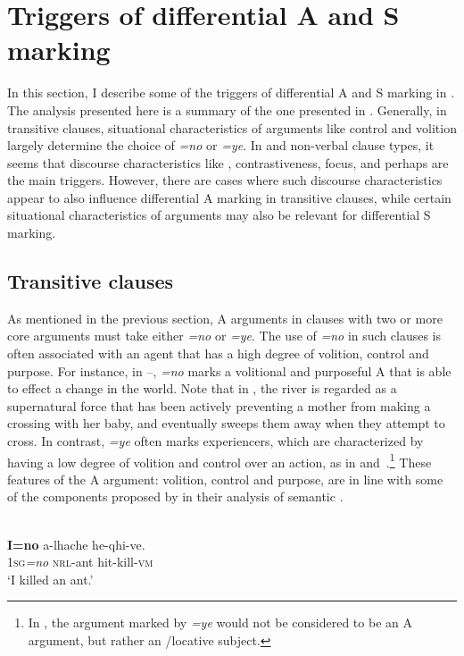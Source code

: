 \documentclass[output=paper]{LSP/langsci}
\begin{document}
\section{Triggers of differential A and S marking} \label{13-te-sec:3}

In this section, I describe some of the triggers of differential A and S marking in . The analysis presented here is a summary of the one presented in \citet{Teo.2012}. Generally, in transitive clauses, situational characteristics of arguments like control and volition largely determine the choice of \textit{=no} or \textit{=ye}. In  and non-verbal clause types, it seems that discourse characteristics like , contrastiveness, focus, and perhaps  are the main triggers. However, there are cases where such discourse characteristics appear to also influence differential A marking in transitive clauses, while certain situational characteristics of arguments may also be relevant for differential S marking.


\subsection{Transitive clauses}\label{13-te-sec:3.1}

As mentioned in the previous section, A arguments in clauses with two or more core arguments must take either \textit{=no} or \textit{=ye}. The use of \textit{=no} in such clauses is often associated with an agent that has a high degree of volition, control and purpose. For instance, in --, \textit{=no} marks a volitional and purposeful A that is able to effect a change in the world. Note that in , the river is regarded as a supernatural force that has been actively preventing a mother from making a crossing with her baby, and eventually sweeps them away when they attempt to cross. In contrast, \textit{=ye} often marks experiencers, which are characterized by having a low degree of volition and control over an action, as in  and~.\footnote{In , the argument marked by \textit{=ye} would not be considered to be an A argument, but rather an /locative subject.}
These features of the A argument: volition, control and purpose, are in line with some of the components proposed by  \citet{Hopperetal1980Transitivity} in their analysis of semantic .

\ea\label{13-te-ex:9}
\\
\gll  \textbf{I=no} a-lhache he-qhi-ve. \\
\textsc{1sg}\textit{=no}\textsc{} \textsc{nrl-}ant\textsc{\-} hit-kill-\textsc{vm}\\
\glt ‘I killed an ant.’ %
\z
\end{document}
